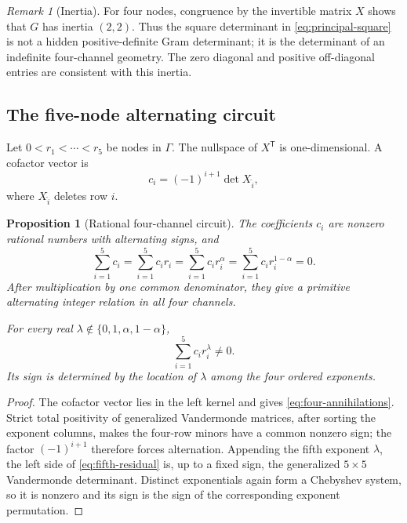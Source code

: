 \documentclass[11pt]{article}
\newtheorem{proposition}[theorem]{Proposition}
\theoremstyle{definition}
\theoremstyle{remark}
\newtheorem{remark}[theorem]{Remark}
\begin{document}
\begin{remark}[Inertia]
For four nodes, congruence by the invertible matrix $X$ shows that $G$ has inertia $(2,2)$.  Thus the square determinant in \eqref{eq:principal-square} is not a hidden positive-definite Gram determinant; it is the determinant of an indefinite four-channel geometry.  The zero diagonal and positive off-diagonal entries are consistent with this inertia.
\end{remark}

\subsection{The five-node alternating circuit}

Let $0<r_1<\cdots<r_5$ be nodes in $\Gamma$.  The nullspace of $X^{\mathsf T}$ is one-dimensional.  A cofactor vector is
\begin{equation}\label{eq:circuit-coeff}
 c_i=(-1)^{i+1}\det X_{\widehat{i}},
\end{equation}
where $X_{\widehat{i}}$ deletes row $i$.

\begin{proposition}[Rational four-channel circuit]\label{prop:circuit}
The coefficients $c_i$ are nonzero rational numbers with alternating signs, and
\begin{equation}\label{eq:four-annihilations}
 \sum_{i=1}^5c_i
 =\sum_{i=1}^5c_ir_i
 =\sum_{i=1}^5c_ir_i^\alpha
 =\sum_{i=1}^5c_ir_i^{1-\alpha}=0.
\end{equation}
After multiplication by one common denominator, they give a primitive alternating integer relation in all four channels.

For every real $\lambda\notin\{0,1,\alpha,1-\alpha\}$,
\begin{equation}\label{eq:fifth-residual}
 \sum_{i=1}^5c_ir_i^\lambda\ne0.
\end{equation}
Its sign is determined by the location of $\lambda$ among the four ordered exponents.
\end{proposition}

\begin{proof}
The cofactor vector lies in the left kernel and gives \eqref{eq:four-annihilations}.  Strict total positivity of generalized Vandermonde matrices, after sorting the exponent columns, makes the four-row minors have a common nonzero sign; the factor $(-1)^{i+1}$ therefore forces alternation.  Appending the fifth exponent $\lambda$, the left side of \eqref{eq:fifth-residual} is, up to a fixed sign, the generalized $5\times5$ Vandermonde determinant.  Distinct exponentials again form a Chebyshev system, so it is nonzero and its sign is the sign of the corresponding exponent permutation.
\end{proof}
\end{document}

